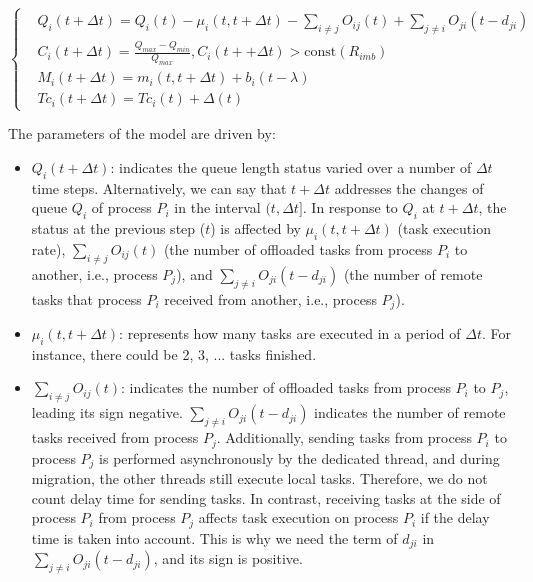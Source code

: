 \begin{equation} \label{eq:react_model}
	\begin{cases}
		& Q_{i}(t + \Delta t) = Q_{i}(t) - \mu_{i}(t, t+\Delta t) - \sum_{i \neq j} O_{ij}(t) + \sum_{j \neq i} O_{ji}(t -d_{ji}) \\ 
		& C_{i}(t + \Delta t) = \frac{Q_{max} - Q_{min}}{Q_{max}}, C_{i}(t + + \Delta t) > \text{const}(R_{imb}) \\
		& M_{i}(t + \Delta t) = m_{i}(t, t+\Delta t) + b_{i}(t - \lambda) \\
		& Tc_{i}(t + \Delta t) = Tc_{i}(t) + \Delta(t)
	\end{cases}
\end{equation}

The parameters of the model are driven by:

\begin{itemize}
	\item $Q_{i}(t + \Delta t)$: indicates the queue length status varied over a number of $\Delta t$ time steps. Alternatively, we can say that $t + \Delta t$ addresses the changes of queue $Q_{i}$ of process $P_{i}$ in the interval $(t, \Delta t]$. In response to $Q_{i}$ at $t + \Delta t$, the status at the previous step ($t$) is affected by $\mu_{i}(t, t+\Delta t)$ (task execution rate), $\sum_{i \neq j} O_{ij}(t)$ (the number of offloaded tasks from process $P_{i}$ to another, i.e., process $P_{j}$), and $\sum_{j \neq i} O_{ji}(t - d_{ji})$ (the number of remote tasks that process $P_{i}$ received from another, i.e., process $P_{j}$).
	
	\item $\mu_{i}(t, t+\Delta t)$: represents how many tasks are executed in a period of $\Delta t$. For instance, there could be 2, 3, ... tasks finished.
	
	\item $\sum_{i \neq j} O_{ij}(t)$: indicates the number of offloaded tasks from process $P_{i}$ to $P_{j}$, leading its sign negative. $\sum_{j \neq i} O_{ji}(t - d_{ji})$ indicates the number of remote tasks received from process $P_{j}$. Additionally, sending tasks from process $P_{i}$ to process $P_{j}$ is performed asynchronously by the dedicated thread, and during migration, the other threads still execute local tasks. Therefore, we do not count delay time for sending tasks. In contrast, receiving tasks at the side of process $P_{i}$ from process $P_{j}$ affects task execution on process $P_{i}$ if the delay time is taken into account. This is why we need the term of $d_{ji}$ in $\sum_{j \neq i} O_{ji}(t - d_{ji})$, and its sign is positive.
	

\end{itemize}
